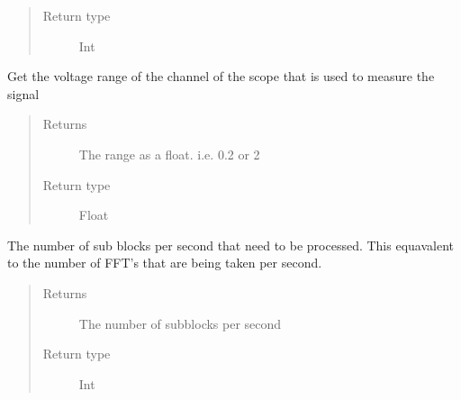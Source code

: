 \documentclass[letterpaper,10pt,english]{sphinxmanual}
\begin{document}
\begin{fulllineitems}
\begin{fulllineitems}
\begin{quote}
\begin{description}
\item[{Return type}] \leavevmode
\sphinxAtStartPar
Int

\end{description}\end{quote}

\end{fulllineitems}


\begin{fulllineitems}
\label{\detokenize{index:TiePieLCR_settings.TiePieLCR_settings.get_signal_scope_range_value}}
\sphinxAtStartPar
Get the voltage range of the channel of the scope that is used to measure the signal
\begin{quote}\begin{description}
\item[{Returns}] \leavevmode
\sphinxAtStartPar
The range as a float. i.e. 0.2 or 2

\item[{Return type}] \leavevmode
\sphinxAtStartPar
Float

\end{description}\end{quote}

\end{fulllineitems}


\begin{fulllineitems}
\label{\detokenize{index:TiePieLCR_settings.TiePieLCR_settings.get_sub_block_freq}}
\sphinxAtStartPar
The number of sub blocks per second that need to be processed. This equavalent to the number of FFT’s that are being taken per second.
\begin{quote}\begin{description}
\item[{Returns}] \leavevmode
\sphinxAtStartPar
The number of sub\sphinxhyphen{}blocks per second

\item[{Return type}] \leavevmode
\sphinxAtStartPar
Int


\end{description}
\end{quote}
\end{fulllineitems}
\end{fulllineitems}
\end{document}
